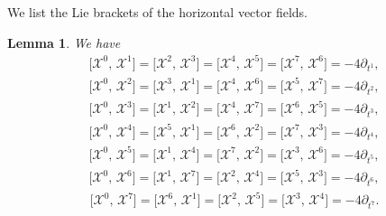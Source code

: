 \documentclass[10pt,a4paper]{amsart}
\numberwithin{equation}{section}
\newtheorem{lemma}[theorem]{Lemma}
\begin{document}
We list the Lie brackets of the horizontal vector fields.
\begin{lemma}\label{lemma2.1}
We have
  \begin{equation*}
      \begin{aligned}
\big[\mathscr{X}^0,\,\mathscr{X}^1\big]=\big[\mathscr{X}^2,\,\mathscr{X}^3\big]=\big[\mathscr{X}^4,\,\mathscr{X}^5\big]=\big[\mathscr{X}^7,\,\mathscr{X}^6\big]=-4\partial_{t^1},
      \end{aligned}
  \end{equation*}
  \begin{equation*}
      \begin{aligned}
\big[\mathscr{X}^0,\,\mathscr{X}^2\big]=\big[\mathscr{X}^3,\,\mathscr{X}^1\big]=\big[\mathscr{X}^4,\,\mathscr{X}^6\big]=\big[\mathscr{X}^5,\,\mathscr{X}^7\big]=-4\partial_{t^2},
      \end{aligned}
  \end{equation*}
  \begin{equation*}
      \begin{aligned}
\big[\mathscr{X}^0,\,\mathscr{X}^3\big]=\big[\mathscr{X}^1,\,\mathscr{X}^2\big]=\big[\mathscr{X}^4,\,\mathscr{X}^7\big]=\big[\mathscr{X}^6,\,\mathscr{X}^5\big]=-4\partial_{t^3},
      \end{aligned}
  \end{equation*}
  \begin{equation*}
      \begin{aligned}
\big[\mathscr{X}^0,\,\mathscr{X}^4\big]=\big[\mathscr{X}^5,\,\mathscr{X}^1\big]=\big[\mathscr{X}^6,\,\mathscr{X}^2\big]=\big[\mathscr{X}^7,\,\mathscr{X}^3\big]=-4\partial_{t^4},
      \end{aligned}
  \end{equation*}
  \begin{equation*}
      \begin{aligned}
\big[\mathscr{X}^0,\,\mathscr{X}^5\big]=\big[\mathscr{X}^1,\,\mathscr{X}^4\big]=\big[\mathscr{X}^7,\,\mathscr{X}^2\big]=\big[\mathscr{X}^3,\,\mathscr{X}^6\big]=-4\partial_{t^5},
      \end{aligned}
  \end{equation*}
  \begin{equation*}
      \begin{aligned}
\big[\mathscr{X}^0,\,\mathscr{X}^6\big]=\big[\mathscr{X}^1,\,\mathscr{X}^7\big]=\big[\mathscr{X}^2,\,\mathscr{X}^4\big]=\big[\mathscr{X}^5,\,\mathscr{X}^3\big]=-4\partial_{t^6},
      \end{aligned}
  \end{equation*}
  \begin{equation*}
\begin{aligned}
\big[\mathscr{X}^0,\,\mathscr{X}^7\big]=\big[\mathscr{X}^6,\,\mathscr{X}^1\big]=\big[\mathscr{X}^2,\,\mathscr{X}^5\big]=\big[\mathscr{X}^3,\,\mathscr{X}^4\big]=-4\partial_{t^7}.
      \end{aligned}
  \end{equation*}
\end{lemma}
\end{document}
